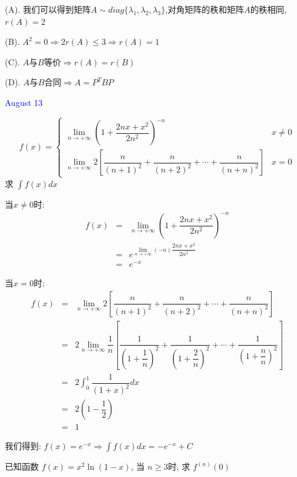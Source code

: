 \begin{solution}

	(A). 我们可以得到矩阵$A\sim diag\{\lambda_{1},\lambda_{2},\lambda_{3}\}$,对角矩阵的秩和矩阵$A$的秩相同,$r(A)=2$
	
	(B). $A^2=0\Rightarrow 2r(A)\leq 3\Rightarrow r(A)=1$
	
	(C). $A$与$B$等价$\Rightarrow r(A)=r(B)$
	
	(D). $A$与$B$合同$\Rightarrow A=P^{T}BP$
\end{solution}


\textcolor{blue}{August 13}

\begin{example}[][Exam: 34.2.11]
	$$f(x)=\begin{cases}
		\lim\limits_{n\to +\infty}\left( 1+\dfrac{2nx+x^2}{2n^2}\right)^{-n} & x\neq 0\\
		\lim\limits_{n\to +\infty}2\left[ \dfrac{n}{(n+1)^2}+\dfrac{n}{(n+2)^2}+\cdots+\dfrac{n}{(n+n)^2}\right] & x=0 	
	\end{cases}$$
	求 $\int f(x)dx$
\end{example}

\begin{solution}

	当$x\neq 0$时:  
	\begin{eqnarray*}
		f(x)&=&\lim\limits_{n\to +\infty}\left( 1+\dfrac{2nx+x^2}{2n^2}\right)^{-n}\\
		&=&e^{\lim\limits_{n\to +\infty}(-n)\dfrac{2nx+x^2}{2n^2}}\\
		&=&e^{-x}
	\end{eqnarray*}

	当$x=0$时:  
	\begin{eqnarray*}
		f(x)&=&\lim\limits_{n\to +\infty}2\left[ \dfrac{n}{(n+1)^2}+\dfrac{n}{(n+2)^2}+\cdots+\dfrac{n}{(n+n)^2}\right]\\
		&=&2\lim\limits_{n\to +\infty}\dfrac{1}{n}\left[ \dfrac{1}{(1+\dfrac{1}{n})^2}+\dfrac{1}{(1+\dfrac{2}{n})^2}+\cdots+\dfrac{1}{(1+\dfrac{n}{n})^2}\right]\\
		&=&2\int_{0}^{1}\dfrac{1}{(1+x)^2}dx\\
		&=&2(1-\dfrac{1}{2})\\
		&=&1
	\end{eqnarray*}

	我们得到:  $f(x)=e^{-x}\Rightarrow \int f(x)dx=-e^{-x}+C$
\end{solution}

\begin{example}[][Exam: 34.2.12]
	已知函数 $f(x)=x^2\ln(1-x)$, 当 $n\geq 3$时, 求 $f^{(n)}(0)$
\end{example}

